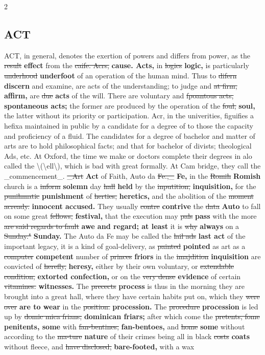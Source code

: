 \documentclass[10pt]{article}
\begin{document}
\begin{multicols}{2}
\subsection*{ACT}
ACT, in general, denotes the exertion of powers and differs from power, as the \sout{result} \textbf{effect} from the \sout{caife. Acrs,} \textbf{cause. Acts,} in \sout{logics} \textbf{logic,} is particularly \sout{underhood} \textbf{underfoot} of an operation of the human mind. Thus to \sout{difern} \textbf{discern} and examine, are acts of the understanding; to judge and \sout{at firm,} \textbf{affirm,} are \sout{due} \textbf{acts} of the will. There are voluntary and \sout{fpoantous acts,} \textbf{spontaneous acts;} the former are produced by the operation of the \sout{foul,} \textbf{soul,} the latter without its priority or participation. Acr, in the univerities, figuifies a hefixa maintained in public by a candidate for a degree of to those the capacity and proficiency of a fluid. The candidates for a degree of bachelor and matter of arts are to hold philosophical facts; and that for bachelor of divists; theological Ads, etc. At Oxford, the time we make or doctors complete their degrees in alo called the \textbackslash{}(\textbackslash{}ell\textbackslash{}), which is bad with great formally. At Cam bridge, they call the \_commencement\_. \sout{\_Art} \textbf{Act} of Faith, Auto da \sout{Fe.,\_} \textbf{Fe,} in the \sout{Romih} \textbf{Romish} church is a \sout{inform} \textbf{solemn} day \sout{hall} \textbf{held} by the \sout{inputition,} \textbf{inquisition,} for the \sout{punihmatic} \textbf{punishment} of \sout{herties,} \textbf{heretics,} and the abolition of the \sout{moment acready.} \textbf{innocent accused.} They usually \sout{contre} \textbf{contrive} the \sout{data} \textbf{Auto} to fall on some great \sout{fellows,} \textbf{festival,} that the execution may \sout{pals} \textbf{pass} with the more \sout{are said regards to fault} \textbf{awe and regard; at least} it is \sout{why} \textbf{always} on a \sout{Sunday."} \textbf{Sunday.} The Auto da Fe may be called the \sout{lail ads} \textbf{last act} of the important legacy, it is a kind of goal-delivery, as \sout{painted} \textbf{pointed} as art as a \sout{computer} \textbf{competent} number of \sout{princes} \textbf{friors} in the \sout{imajdition} \textbf{inquisition} are convicted of \sout{herefly,} \textbf{heresy,} either by their own voluntary, or \sout{extendable condition,} \textbf{extorted confection,} or on the \sout{very dense} \textbf{evidence} of certain \sout{vitamines.} \textbf{witnesses.} The \sout{precects} \textbf{process} is thus in the morning they are brought into a great hall, where they have certain habits put on, which they \sout{were over} \textbf{are to wear} in the \sout{position.} \textbf{procession.} The \sout{procedure} \textbf{procession} is led up by \sout{domic mica frians;} \textbf{dominican friars;} after which come the \sout{pretents, fome} \textbf{penitents, some} with \sout{fan-bentines,} \textbf{fan-bentoes,} and \sout{home} \textbf{some} without according to the \sout{ma-ture} \textbf{nature} of their crimes being all in black \sout{costs} \textbf{coats} without fleece, and \sout{have disclosed,} \textbf{bare-footed,} with a wax 
\end{multicols}
\end{document}
